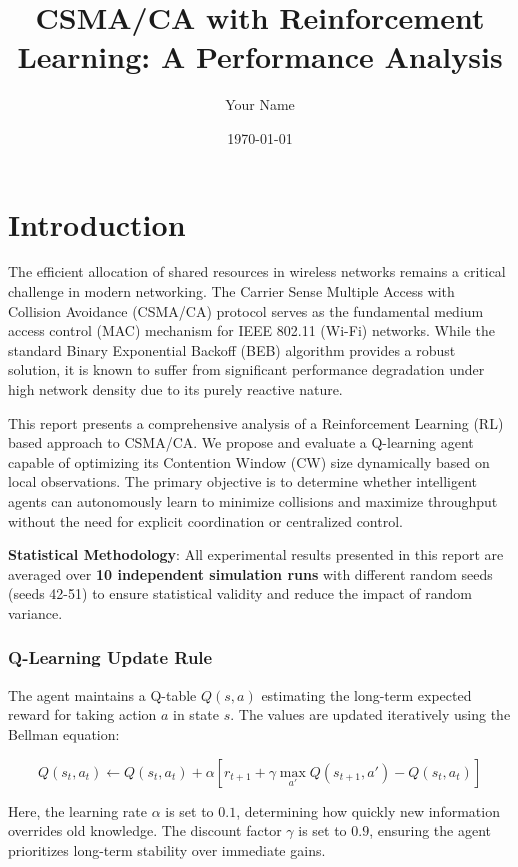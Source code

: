 \documentclass[12pt,a4paper,oneside]{article}
\title{CSMA/CA with Reinforcement Learning: A Performance Analysis}
\author{Your Name}
\date{\today}
\theoremstyle{definition}
\begin{document}
\maketitle
\newpage
\tableofcontents
\newpage

\section{Introduction}

The efficient allocation of shared resources in wireless networks remains a critical challenge in modern networking. The Carrier Sense Multiple Access with Collision Avoidance (CSMA/CA) protocol serves as the fundamental medium access control (MAC) mechanism for IEEE 802.11 (Wi-Fi) networks. While the standard Binary Exponential Backoff (BEB) algorithm provides a robust solution, it is known to suffer from significant performance degradation under high network density due to its purely reactive nature.

This report presents a comprehensive analysis of a Reinforcement Learning (RL) based approach to CSMA/CA. We propose and evaluate a Q-learning agent capable of optimizing its Contention Window (CW) size dynamically based on local observations. The primary objective is to determine whether intelligent agents can autonomously learn to minimize collisions and maximize throughput without the need for explicit coordination or centralized control.

\textbf{Statistical Methodology}: All experimental results presented in this report are averaged over \textbf{10 independent simulation runs} with different random seeds (seeds 42-51) to ensure statistical validity and reduce the impact of random variance.


\subsubsection{Q-Learning Update Rule}
The agent maintains a Q-table $Q(s, a)$ estimating the long-term expected reward for taking action $a$ in state $s$. The values are updated iteratively using the Bellman equation:

\[ Q(s_t, a_t) \leftarrow Q(s_t, a_t) + \alpha \left[ r_{t+1} + \gamma \max_{a'} Q(s_{t+1}, a') - Q(s_t, a_t) \right] \]

Here, the learning rate $\alpha$ is set to $0.1$, determining how quickly new information overrides old knowledge. The discount factor $\gamma$ is set to $0.9$, ensuring the agent prioritizes long-term stability over immediate gains.
\end{document}
